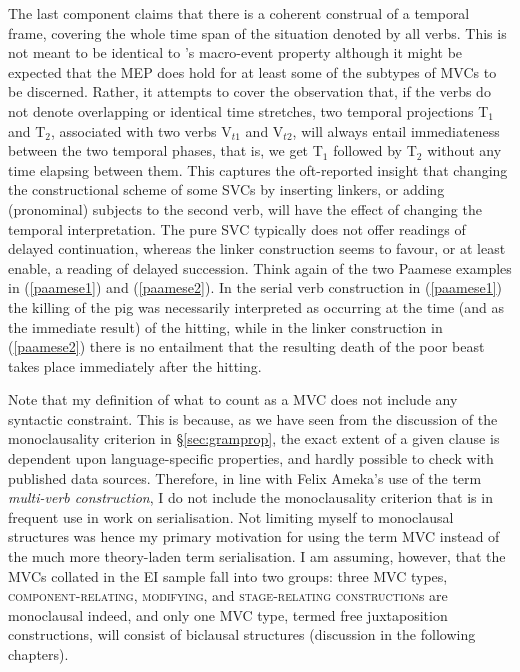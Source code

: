 The last component claims that there is a coherent construal of a temporal frame, covering the whole time span of the situation denoted by all verbs. This is not meant to be identical to \citeauthor{bohnemeyer2007principles}'s macro-event property although it might be expected that the MEP does hold for at least some of the subtypes of MVCs to be discerned. Rather, it attempts to cover the observation that, if the verbs do not denote overlapping or identical time stretches, two temporal projections T$_1$ and T$_2$, associated with two verbs V$_{t1}$ and V$_{t2}$, will always entail immediateness between the two temporal phases, that is, we get T$_1$ followed by T$_2$ without any time elapsing between them. This captures the oft-reported insight that changing the constructional scheme of some SVCs by inserting linkers, or adding (pronominal) subjects to the second verb, will have the effect of changing the temporal interpretation. The pure SVC typically does not offer readings of delayed continuation, whereas the linker construction seems to favour, or at least enable, a reading of delayed succession. Think again of the two Paamese examples in (\ref{paamese1}) and (\ref{paamese2}). In the serial verb construction in (\ref{paamese1}) the killing of the pig was necessarily interpreted as occurring at the time (and as the immediate result) of the hitting, while in the linker construction in (\ref{paamese2}) there is no entailment that the resulting death of the poor beast takes place immediately after the hitting.

Note that my definition of what to count as a MVC does not include any syntactic constraint. This is because, as we have seen from the discussion of the monoclausality criterion in §\ref{sec:gramprop}, the exact extent of a given clause is dependent upon language-specific properties, and hardly possible to check with published data sources. Therefore, in line with Felix Ameka's use of the term \textit{multi-verb construction}, I do not include the monoclausality criterion that is in frequent use in work on serialisation. Not limiting myself to monoclausal structures was hence my primary motivation for using the term MVC instead of the much more theory-laden term serialisation. I am assuming, however, that the MVCs collated in the EI sample fall into two groups: three MVC types, \textsc{component-relating}, \textsc{modifying}, and \textsc{stage-relating construction}s are monoclausal indeed, and only one MVC type, termed free juxtaposition constructions, will consist of biclausal structures (discussion in the following chapters). 

